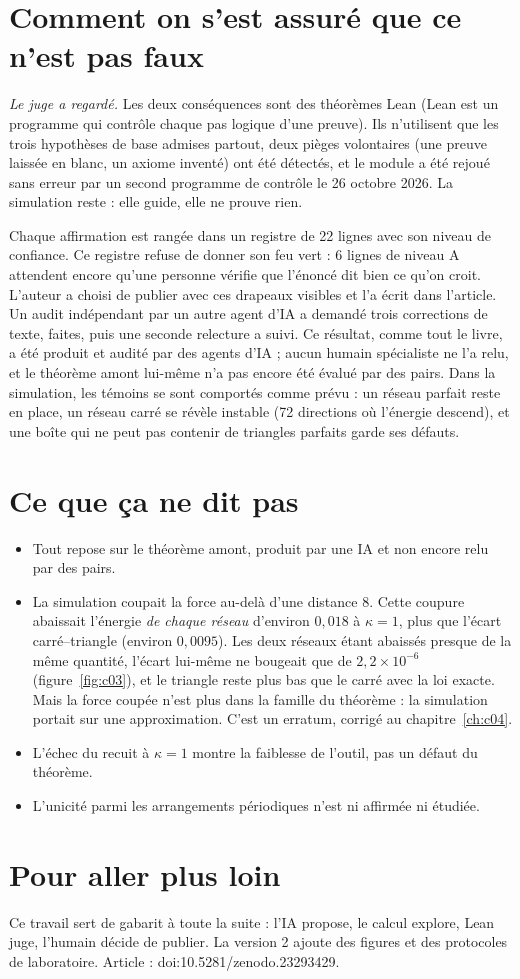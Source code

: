 \section*{Comment on s'est assuré que ce n'est pas faux}

 \emph{Le juge a regardé.} Les deux conséquences sont des théorèmes Lean (Lean est un programme qui contrôle
chaque pas logique d'une preuve). Ils n'utilisent que les trois hypothèses de base admises partout, deux pièges
volontaires (une preuve laissée en blanc, un axiome inventé) ont été détectés, et le module a été rejoué sans erreur
par un second programme de contrôle le 26 octobre 2026. La simulation reste  : elle guide, elle ne prouve
rien.

Chaque affirmation est rangée dans un registre de 22 lignes avec son niveau de confiance. Ce registre refuse de
donner son feu vert : 6 lignes de niveau A attendent encore qu'une personne vérifie que l'énoncé dit bien ce qu'on
croit. L'auteur a choisi de publier avec ces drapeaux visibles et l'a écrit dans l'article. Un audit indépendant par
un autre agent d'IA a demandé trois corrections de texte, faites, puis une seconde relecture a suivi. Ce résultat,
comme tout le livre, a été produit et audité par des agents d'IA ; aucun humain spécialiste ne l'a relu, et le
théorème amont lui-même n'a pas encore été évalué par des pairs. Dans la simulation, les témoins se sont comportés
comme prévu : un réseau parfait reste en place, un réseau carré se révèle instable (72 directions où l'énergie
descend), et une boîte qui ne peut pas contenir de triangles parfaits garde ses défauts.

\section*{Ce que ça ne dit pas}

\begin{limite}
\begin{itemize}
\item Tout repose sur le théorème amont, produit par une IA et non encore relu par des pairs.
\item La simulation coupait la force au-delà d'une distance 8. Cette coupure abaissait l'énergie \emph{de chaque
réseau} d'environ $0{,}018$ à $\kappa=1$, plus que l'écart carré--triangle (environ $0{,}0095$). Les deux réseaux
étant abaissés presque de la même quantité, l'écart lui-même ne bougeait que de $2{,}2\times10^{-6}$
(figure~\ref{fig:c03}), et le triangle reste plus bas que le carré avec la loi exacte. Mais la force coupée n'est
plus dans la famille du théorème : la simulation portait sur une approximation. C'est un erratum, corrigé au
chapitre~\ref{ch:c04}.
\item L'échec du recuit à $\kappa=1$ montre la faiblesse de l'outil, pas un défaut du théorème.
\item L'unicité parmi les arrangements périodiques n'est ni affirmée ni étudiée.
\end{itemize}
\end{limite}

\section*{Pour aller plus loin}

Ce travail sert de gabarit à toute la suite : l'IA propose, le calcul explore, Lean juge, l'humain décide de publier.
La version 2 ajoute des figures et des protocoles de laboratoire. Article : doi:10.5281/zenodo.23293429.
